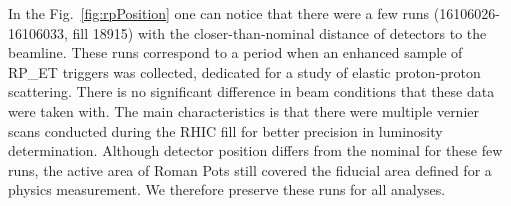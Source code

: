 In the Fig.~\ref{fig:rpPosition} one can notice that there were a few runs (16106026-16106033, fill 18915) with the closer-than-nominal distance of detectors to the beamline. These runs correspond to a period when an enhanced sample of RP\_ET triggers was collected, dedicated for a study of elastic proton-proton scattering. There is no significant difference in beam conditions that these data were taken with. The main characteristics is that there were multiple vernier scans conducted during the RHIC fill for better precision in luminosity determination. Although detector position differs from the nominal for these few runs, the active area of Roman Pots still covered the fiducial area defined for a physics measurement. We therefore preserve these runs for all analyses. 

\begin{figure}[hb]
\centering
\parbox{0.4\textwidth}{
  \centering
  \begin{subfigure}[b]{\linewidth}{
                }
  \end{subfigure}
}
\quad
\parbox{0.545\textwidth}{
  \centering
  \begin{subfigure}[b]{\linewidth}{
                }

\end{subfigure}}
\end{figure}
